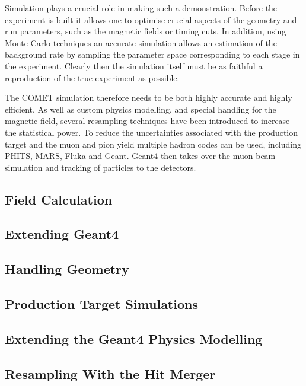 Simulation plays a crucial role in making such a demonstration. 
Before the experiment is built it allows one to optimise crucial aspects of the geometry and run parameters, such as the magnetic fields or timing cuts.
In addition, using Monte Carlo techniques an accurate simulation allows an estimation of the background rate by sampling the parameter space corresponding to each stage in the experiment.
Clearly then the simulation itself must be as faithful a reproduction of the true experiment as possible.

The COMET simulation therefore needs to be both highly accurate and highly efficient.
As well as custom physics modelling, and special handling for the magnetic field, several resampling techniques have been introduced to increase the statistical power.
To reduce the uncertainties associated with the production target and the muon and pion yield multiple hadron codes can be used, including PHITS, MARS, Fluka and Geant.
Geant4 then takes over the muon beam simulation and tracking of particles to the detectors.

\subsection{Field Calculation}

\subsection{Extending Geant4}

\subsection{Handling Geometry}

\subsection{Production Target Simulations}

\subsection{Extending the Geant4 Physics Modelling}

\subsection{Resampling With the Hit Merger}


